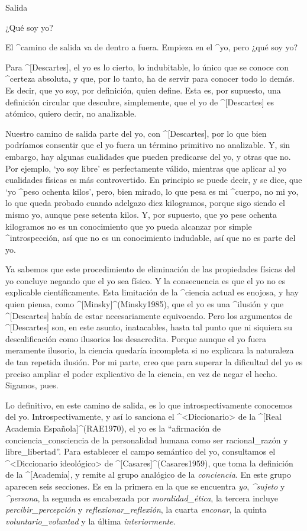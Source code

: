 
\Part Salida

\Section ¿Qué soy yo?

El ^{camino de salida} va de dentro a fuera. Empieza en el ^{yo}, pero
¿qué soy yo?

Para ^[Descartes], el yo es lo cierto, lo indubitable, lo único que se
conoce con ^{certeza} absoluta, y que, por lo tanto, ha de servir para
conocer todo lo demás. Es decir, que yo soy, por definición, quien
define. Esta es, por supuesto, una definición circular que descubre,
simplemente, que el yo de ^[Descartes] es atómico, quiero decir, no
analizable.

Nuestro camino de salida parte del yo, con ^[Descartes], por lo que bien
podríamos consentir que el yo fuera un término primitivo no analizable.
Y, sin embargo, hay algunas cualidades que pueden predicarse del yo, y
otras que no. Por ejemplo, `yo soy libre' es perfectamente válido,
mientras que aplicar al yo cualidades físicas es más controvertido. En
principio se puede decir, y se dice, que `yo ^{peso} ochenta kilos',
pero, bien mirado, lo que pesa es mi ^{cuerpo}, no mi yo, lo que queda
probado cuando adelgazo diez kilogramos, porque sigo siendo el mismo yo,
aunque pese setenta kilos. Y, por supuesto, que yo pese ochenta
kilogramos no es un conocimiento que yo pueda alcanzar por simple
^{introspección}, así que no es un conocimiento indudable, así que no es
parte del yo.

Ya sabemos que este procedimiento de eliminación de las propiedades
físicas del yo concluye negando que el yo sea físico. Y la consecuencia
es que el yo no es explicable científicamente. Esta limitación de la
^{ciencia} actual es enojosa, y hay quien piensa, como
^[Minsky]^(Minsky1985), que el yo es una ^{ilusión} y que ^[Descartes]
había de estar necesariamente equivocado. Pero los argumentos de
^[Descartes] son, en este asunto, inatacables, hasta tal punto que ni
siquiera su descalificación como ilusorios los desacredita. Porque
aunque el yo fuera meramente ilusorio, la ciencia quedaría incompleta si
no explicara la naturaleza de tan repetida ilusión. Por mi parte, creo
que para superar la dificultad del yo es preciso ampliar el poder
explicativo de la ciencia, en vez de negar el hecho. Sigamos, pues.

Lo definitivo, en este camino de salida, es lo que introspectivamente
conocemos del yo. Introspectivamente, y así lo sanciona el
^<Diccionario> de la ^[Real Academia Española]^(RAE1970), el yo es la
``afirmación de conciencia_{consciencia} de la personalidad humana como
ser racional_{razón} y libre_{libertad}''. Para establecer el campo
semántico del yo, consultamos el ^<Diccionario ideológico> de
^[Casares]^(Casares1959), que toma la definición de la ^[Academia], y
remite al grupo analógico de la {\em conciencia}. En este grupo aparecen
seis secciones. Es en la primera en la que se encuentra {\em yo}, {\em
^{sujeto}} y {\em ^{persona}}, la segunda es encabezada por {\em
moralidad_{ética}}, la tercera incluye {\em percibir_{percepción}} y
{\em reflexionar_{reflexión}}, la cuarta {\em enconar}, la quinta {\em
voluntario_{voluntad}} y la última {\em interiormente}.

